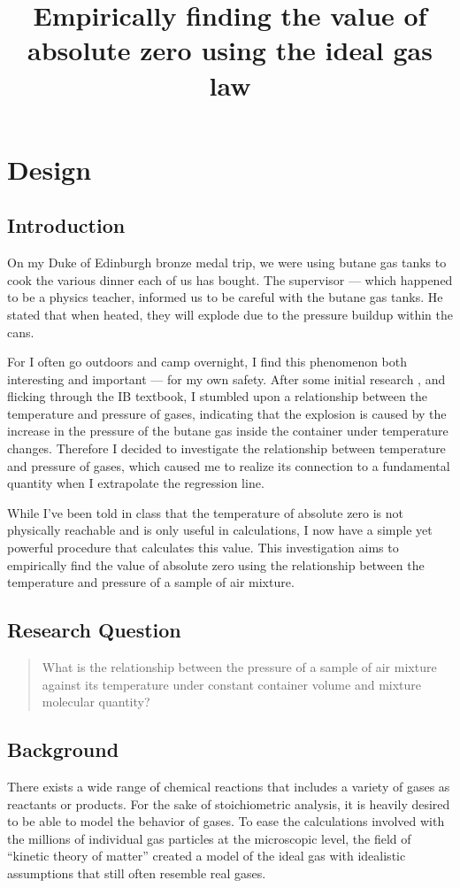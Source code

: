 \documentclass[a4paper,12pt]{article}
\title{Empirically finding the value of absolute zero using the ideal gas law}
\author{}
\date{\vspace{-8ex}}
\begin{document}
\maketitle

\section{Design}
\subsection{Introduction}
On my Duke of Edinburgh bronze medal trip, we were using butane gas tanks to cook the various dinner each of us has bought. The supervisor --- which happened to be a physics teacher, informed us to be careful with the butane gas tanks. He stated that when heated, they will explode due to the pressure buildup within the cans.

For I often go outdoors and camp overnight, I find this phenomenon both interesting and important --- for my own safety. After some initial research \parencite{lpg}, and flicking through the IB textbook, I stumbled upon a relationship between the temperature and pressure of gases, indicating that the explosion is caused by the increase in the pressure of the butane gas inside the container under temperature changes. Therefore I decided to investigate the relationship between temperature and pressure of gases, which caused me to realize its connection to a fundamental quantity when I extrapolate the regression line.

While I've been told in class that the temperature of absolute zero is not physically reachable and is only useful in calculations, I now have a simple yet powerful procedure that calculates this value. This investigation aims to empirically find the value of absolute zero using the relationship between the temperature and pressure of a sample of air mixture.


\subsection{Research Question}
\begin{quote}
    What is the relationship between the pressure of a sample of air mixture against its temperature under constant container volume and mixture molecular quantity?
\end{quote}

\subsection{Background}
There exists a wide range of chemical reactions that includes a variety of gases as reactants or products. For the sake of stoichiometric analysis, it is heavily desired to be able to model the behavior of gases. To ease the calculations involved with the millions of individual gas particles at the microscopic level, the field of ``kinetic theory of matter'' created a model of the ideal gas with idealistic assumptions that still often resemble real gases.
\end{document}
